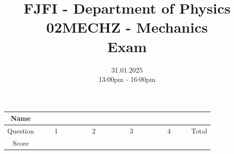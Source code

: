 \documentclass[a4paper,12pt]{article}
\title{{\Large FJFI - Department of Physics} \\ 
                  02MECHZ - Mechanics \\ 
          {\Large \textbf{Exam}}\vspace{-1cm}}
\date{31.01.2025 \\ 13:00pm - 16:00pm}
\author{}
\begin{document}
\maketitle
\vspace{-1.5em}

\begin{center}
    \renewcommand{\arraystretch}{2}
    \begin{tabular}{ |c|c|c|c|c|c| } 
        \hline
        Name& \multicolumn{5}{c|}{\phantom{~~~~~~~~~~~~~~~~~~~~~~~~~~~~~~~~~~~~~~~~~~~~~~~~~~~~~~~~~~~~~~~~~~~~~~~~~~~~~~~}}\\
        \hline
        Question & ~~~~1~~~~ & ~~~~2~~~~ & ~~~~3~~~~ & ~~~~4~~~~ & Total \\ 
        \hline
        Score & &  & & & \\
        \hline
    \end{tabular}
\end{center}

\vspace*{1cm}







\end{document}
